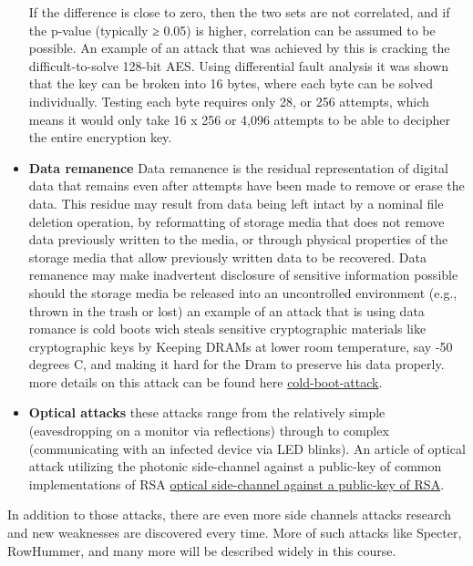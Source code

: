 \begin{itemize}
    If the difference is close to zero, then the two sets are not correlated, and if the p-value (typically ≥ 0.05) is higher, correlation can be assumed to be possible.
    An example of an attack that was achieved by this is cracking the difficult-to-solve 128-bit AES. 
    Using differential fault analysis it was shown that the key can be broken into 16 bytes, where each byte can be solved individually.
    Testing each byte requires only 28, or 256 attempts, which means it would only take 16 x 256 or 4,096 attempts to be able to decipher the entire encryption key. 
    \item \textbf{Data remanence} Data remanence is the residual representation of digital data that remains even after attempts have been made to remove or erase the data.
    This residue may result from data being left intact by a nominal file deletion operation, by reformatting of storage media that does not remove data previously written to the media,
    or through physical properties of the storage media that allow previously written data to be recovered.
    Data remanence may make inadvertent disclosure of sensitive information possible should the storage media be released into an uncontrolled environment (e.g., thrown in the trash or lost)
    an example of an attack that is using data romance is cold boots wich steals sensitive cryptographic materials like cryptographic keys by Keeping DRAMs at lower room temperature,
    say -50 degrees C, and making it hard for the Dram to preserve his data properly.
    more details on this attack can be found here \href{https://resources.infosecinstitute.com/cold-boot-attack/#gref}{cold-boot-attack}.
    \item \textbf{Optical attacks} these attacks range from the relatively simple (eavesdropping on a monitor via reflections) through to complex (communicating with an infected device via LED blinks). 
    An article of optical attack utilizing the photonic side-channel against a public-key of common implementations of RSA \href{https://www.eng.tau.ac.il/~yash/ieee-host-2017.pdf}{optical side-channel against a public-key of RSA}.
\end{itemize}

In addition to those attacks, there are even more side channels attacks research and new weaknesses are discovered every time.
More of such attacks like Specter, RowHummer, and many more will be described widely in this course.

